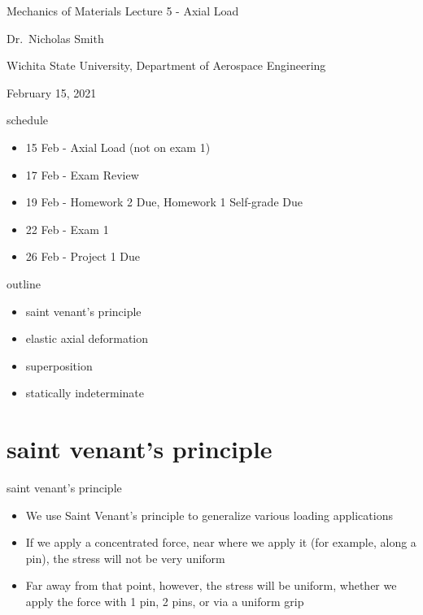 \documentclass[
  letterpaper,
  ignorenonframetext,
  aspectratio=43,
  handout,
  12pt]{beamer}
\author{}
\date{}
\providecommand{\tightlist}{%
  \setlength{\itemsep}{0pt}\setlength{\parskip}{0pt}}
\providecommand{\tightlist}{%
\setlength{\itemsep}{0pt}\setlength{\parskip}{0pt}}
\begin{document}
\begin{frame}{Mechanics of Materials}
\protect\hypertarget{mechanics-of-materials}{}
Lecture 5 - Axial Load

Dr.~Nicholas Smith

Wichita State University, Department of Aerospace Engineering

February 15, 2021
\end{frame}

\begin{frame}{schedule}
\protect\hypertarget{schedule}{}
\begin{itemize}
\tightlist
\item
  15 Feb - Axial Load (not on exam 1)
\item
  17 Feb - Exam Review
\item
  19 Feb - Homework 2 Due, Homework 1 Self-grade Due
\item
  22 Feb - Exam 1
\item
  26 Feb - Project 1 Due
\end{itemize}
\end{frame}

\begin{frame}{outline}
\protect\hypertarget{outline}{}
\begin{itemize}
\tightlist
\item
  saint venant's principle
\item
  elastic axial deformation
\item
  superposition
\item
  statically indeterminate
\end{itemize}
\end{frame}

\hypertarget{saint-venants-principle}{%
\section{saint venant's principle}\label{saint-venants-principle}}

\begin{frame}{saint venant's principle}
\protect\hypertarget{saint-venants-principle-1}{}
\begin{itemize}
\tightlist
\item
  We use Saint Venant's principle to generalize various loading
  applications
\item
  If we apply a concentrated force, near where we apply it (for example,
  along a pin), the stress will not be very uniform
\item
  Far away from that point, however, the stress will be uniform, whether
  we apply the force with 1 pin, 2 pins, or via a uniform grip
\end{itemize}
\end{frame}
\end{document}
